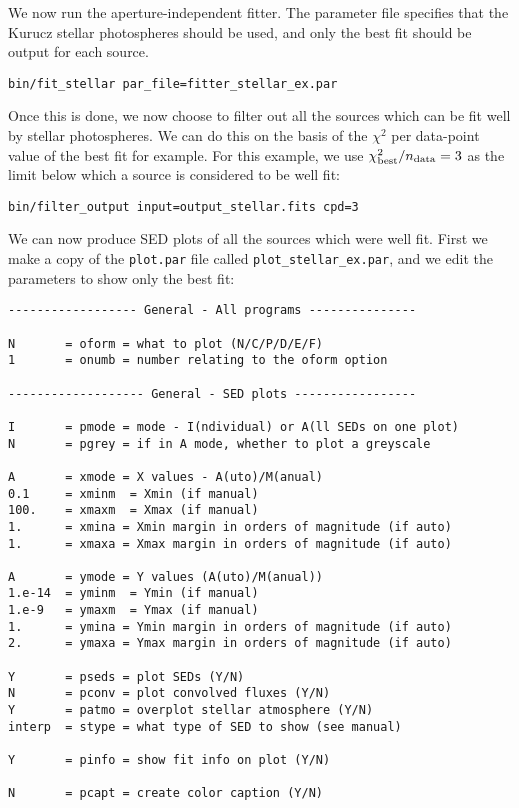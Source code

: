 \documentclass[letterpaper,11pt]{report}
\begin{document}
We now run the aperture-independent fitter. The parameter file specifies that the Kurucz stellar photospheres should be used, and only the best fit should be output for each source. 

\begin{verbatim}
bin/fit_stellar par_file=fitter_stellar_ex.par
\end{verbatim}

Once this is done, we now choose to filter out all the sources which can be fit well by stellar photospheres. We can do this on the basis of the $\chi^2$ per data-point value of the best fit for example. For this example, we use $\chi_{\rm best}^2/n_{\rm data}=3$ as the limit below which a source is considered to be well fit:

\begin{verbatim}
bin/filter_output input=output_stellar.fits cpd=3
\end{verbatim}

We can now produce SED plots of all the sources which were well fit. First we make a copy of the \texttt{plot.par} file called \texttt{plot\_stellar\_ex.par}, and we edit the parameters to show only the best fit:

\begin{scriptsize}
\begin{Verbatim}[frame=single,framesep=5mm,boxwidth=auto]
------------------ General - All programs ---------------

N       = oform = what to plot (N/C/P/D/E/F)
1       = onumb = number relating to the oform option

------------------- General - SED plots -----------------

I       = pmode = mode - I(ndividual) or A(ll SEDs on one plot)
N       = pgrey = if in A mode, whether to plot a greyscale

A       = xmode = X values - A(uto)/M(anual)
0.1     = xminm  = Xmin (if manual)
100.    = xmaxm  = Xmax (if manual)
1.      = xmina = Xmin margin in orders of magnitude (if auto)
1.      = xmaxa = Xmax margin in orders of magnitude (if auto)

A       = ymode = Y values (A(uto)/M(anual))
1.e-14  = yminm  = Ymin (if manual)
1.e-9   = ymaxm  = Ymax (if manual)
1.      = ymina = Ymin margin in orders of magnitude (if auto)
2.      = ymaxa = Ymax margin in orders of magnitude (if auto)

Y       = pseds = plot SEDs (Y/N)
N       = pconv = plot convolved fluxes (Y/N)
Y       = patmo = overplot stellar atmosphere (Y/N)
interp  = stype = what type of SED to show (see manual)

Y       = pinfo = show fit info on plot (Y/N)

N       = pcapt = create color caption (Y/N)
\end{Verbatim}
\end{scriptsize}
\end{document}
